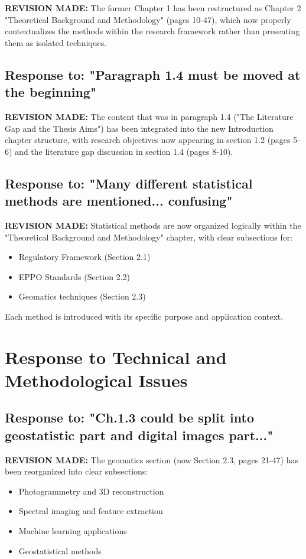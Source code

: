 \documentclass[11pt,a4paper]{article}
\begin{document}
\textbf{REVISION MADE:} The former Chapter 1 has been restructured as Chapter 2 "Theoretical Background and Methodology" (pages 10-47), which now properly contextualizes the methods within the research framework rather than presenting them as isolated techniques.

\subsection{Response to: "Paragraph 1.4 must be moved at the beginning"}

\textbf{REVISION MADE:} The content that was in paragraph 1.4 ("The Literature Gap and the Thesis Aims") has been integrated into the new Introduction chapter structure, with research objectives now appearing in section 1.2 (pages 5-6) and the literature gap discussion in section 1.4 (pages 8-10).

\subsection{Response to: "Many different statistical methods are mentioned... confusing"}

\textbf{REVISION MADE:} Statistical methods are now organized logically within the "Theoretical Background and Methodology" chapter, with clear subsections for:
\begin{itemize}
\item Regulatory Framework (Section 2.1)
\item EPPO Standards (Section 2.2)
\item Geomatics techniques (Section 2.3)
\end{itemize}

Each method is introduced with its specific purpose and application context.

\section{Response to Technical and Methodological Issues}

\subsection{Response to: "Ch.1.3 could be split into geostatistic part and digital images part..."}

\textbf{REVISION MADE:} The geomatics section (now Section 2.3, pages 21-47) has been reorganized into clear subsections:
\begin{itemize}
\item Photogrammetry and 3D reconstruction
\item Spectral imaging and feature extraction
\item Machine learning applications
\item Geostatistical methods
\end{itemize}
\end{document}
